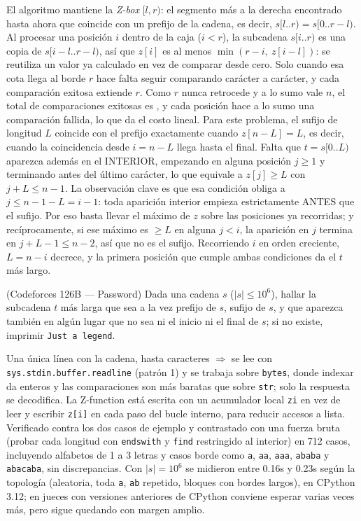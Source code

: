  El algoritmo mantiene la \emph{Z-box} $[l, r)$: el segmento más a la derecha encontrado hasta ahora que coincide con un prefijo de la cadena, es decir, $s[l..r) = s[0..r-l)$. Al procesar una posición $i$ dentro de la caja ($i < r$), la subcadena $s[i..r)$ es una copia de $s[i-l..r-l)$, así que $z[i]$ es al menos $\min(r - i,\ z[i-l])$: se reutiliza un valor ya calculado en vez de comparar desde cero. Solo cuando esa cota llega al borde $r$ hace falta seguir comparando carácter a carácter, y cada comparación exitosa extiende $r$. Como $r$ nunca retrocede y a lo sumo vale $n$, el total de comparaciones exitosas es , y cada posición hace a lo sumo una comparación fallida, lo que da el costo lineal. Para este problema, el sufijo de longitud $L$ coincide con el prefijo exactamente cuando $z[n-L] = L$, es decir, cuando la coincidencia desde $i = n - L$ llega hasta el final. Falta que $t = s[0..L)$ aparezca además en el INTERIOR, empezando en alguna posición $j \ge 1$ y terminando antes del último carácter, lo que equivale a $z[j] \ge L$ con $j + L \le n - 1$. La observación clave es que esa condición obliga a $j \le n - 1 - L = i - 1$: toda aparición interior empieza estrictamente ANTES que el sufijo. Por eso basta llevar el máximo de $z$ sobre las posiciones ya recorridas; y recíprocamente, si ese máximo es $\ge L$ en alguna $j < i$, la aparición en $j$ termina en $j + L - 1 \le n - 2$, así que no es el sufijo. Recorriendo $i$ en orden creciente, $L = n - i$ decrece, y la primera posición que cumple ambas condiciones da el $t$ más largo.~\cite{gusfield1997}


(Codeforces 126B — Password) Dada una cadena $s$ ($|s| \le 10^6$), hallar la subcadena $t$ más larga que sea a la vez prefijo de $s$, sufijo de $s$, y que aparezca también en algún lugar que no sea ni el inicio ni el final de $s$; si no existe, imprimir \texttt{Just a legend}.

 Una única línea con la cadena, hasta  caracteres $\Rightarrow$ se lee con \texttt{sys.stdin.buffer.readline} (patrón 1) y se trabaja sobre \texttt{bytes}, donde indexar da enteros y las comparaciones son más baratas que sobre \texttt{str}; solo la respuesta se decodifica. La Z-function está escrita con un acumulador local \texttt{zi} en vez de leer y escribir \texttt{z[i]} en cada paso del bucle interno, para reducir accesos a lista. Verificado contra los dos casos de ejemplo y contrastado con una fuerza bruta (probar cada longitud con \texttt{endswith} y \texttt{find} restringido al interior) en 712 casos, incluyendo alfabetos de 1 a 3 letras y casos borde como \texttt{a}, \texttt{aa}, \texttt{aaa}, \texttt{ababa} y \texttt{abacaba}, sin discrepancias. Con $|s| = 10^6$ se midieron entre \aprox{}0.16s y \aprox{}0.23s según la topología (aleatoria, toda \texttt{a}, \texttt{ab} repetido, bloques con bordes largos), en CPython 3.12; en jueces con versiones anteriores de CPython conviene esperar varias veces más, pero sigue quedando con margen amplio.

